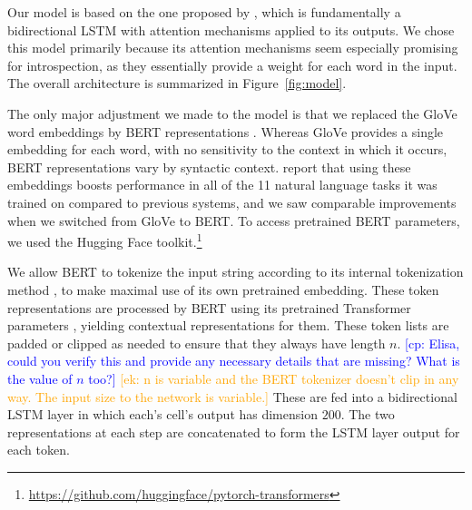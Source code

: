 \documentclass[11pt,a4paper]{article}
\newcommand{\ek}[1]{\textcolor{Orange}{[ek: #1]}}
\newcommand{\cp}[1]{\textcolor{Blue}{[cp: #1]}}
\begin{document}
Our model is based on the one proposed by \citeauthor{Lin:2017}, which is fundamentally a  bidirectional LSTM with attention mechanisms applied to its outputs. We chose this model primarily because its attention mechanisms seem especially promising for introspection, as they essentially provide a weight for each word in the input. The overall architecture is summarized in Figure~\ref{fig:model}.



The only major adjustment we made to the model is that we replaced the GloVe word embeddings \citep{Pennington:2014} by BERT representations \citep{Devlin:2018}. Whereas GloVe provides a single embedding for each word, with no sensitivity to the context in which it occurs, BERT representations vary by syntactic context. \citeauthor{Devlin:2018} report that using these embeddings boosts performance in all of the 11 natural language tasks it was trained on compared to previous systems, and we saw comparable improvements when we switched from GloVe to BERT. To access pretrained BERT parameters, we used the Hugging Face toolkit.\footnote{\url{https://github.com/huggingface/pytorch-transformers}}

We allow BERT to tokenize the input string according to its internal tokenization method \citep{wu2016google}, to make maximal use of its own pretrained embedding. These token representations are processed by BERT using its pretrained Transformer parameters \citep{Vaswani:2017}, yielding contextual representations for them. These token lists are padded or clipped as needed to ensure that they always have length $n$. \cp{Elisa, could you verify this and provide any necessary details that are missing? What is the value of $n$ too?}  \ek{n is variable and the BERT tokenizer doesn't clip in any way. The input size to the network is variable.} These are fed into a bidirectional LSTM layer in which each's cell's output has dimension $200$. The two representations at each step are concatenated to form the LSTM layer output for each token.
\end{document}
